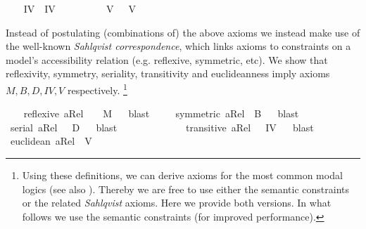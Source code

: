 \begin{isabellebody}
\ \ \isamarkupfalse%
\ IV\ \ {\isachardoublequoteopen}IV\ {\isasymequiv}\ \isactrlbold {\isasymforall}{\isasymphi}{\isachardot}\ \isactrlbold {\isasymbox}{\isasymphi}\ \isactrlbold {\isasymrightarrow}\ \ \isactrlbold {\isasymbox}\isactrlbold {\isasymbox}{\isasymphi}{\isachardoublequoteclose}\isanewline
\ \ \isamarkupfalse%
\ V\ \ \ {\isachardoublequoteopen}V\ {\isasymequiv}\ \isactrlbold {\isasymforall}{\isasymphi}{\isachardot}\ \isactrlbold {\isasymdiamond}{\isasymphi}\ \isactrlbold {\isasymrightarrow}\ \isactrlbold {\isasymbox}\isactrlbold {\isasymdiamond}{\isasymphi}{\isachardoublequoteclose}%
\begin{isamarkuptext}%
Instead of postulating (combinations of) the above  axioms we instead make use of 
  the well-known \emph{Sahlqvist correspondence}, which links axioms to constraints on a model's accessibility
  relation (e.g. reflexive, symmetric, etc). We show  that  reflexivity, symmetry, seriality, transitivity and euclideanness imply
  axioms $M, B, D, IV, V$ respectively.
  \footnote{Using these definitions, we can derive axioms for the most common modal logics (see also \cite{C47}). 
  Thereby we are free to use either the semantic constraints or the related \emph{Sahlqvist} axioms. Here we provide 
  both versions. In what follows we use the semantic constraints (for improved performance).}%
\end{isamarkuptext}\isamarkuptrue%
\ \ \isamarkupfalse%
\ {\isachardoublequoteopen}reflexive\ aRel\ \ {\isasymLongrightarrow}\ \ {\isasymlfloor}M{\isasymrfloor}{\isachardoublequoteclose}%
\ %
%
\isamarkupfalse%
\ blast\ %
%
%
%
\isanewline
\ \ \isamarkupfalse%
\ {\isachardoublequoteopen}symmetric\ aRel\ {\isasymLongrightarrow}\ {\isasymlfloor}B{\isasymrfloor}{\isachardoublequoteclose}%
\ %
%
\isamarkupfalse%
\ blast%
%
%
\isanewline
\ \ \isamarkupfalse%
\ {\isachardoublequoteopen}serial\ aRel\ \ {\isasymLongrightarrow}\ {\isasymlfloor}D{\isasymrfloor}{\isachardoublequoteclose}%
\ %
%
\isamarkupfalse%
\ blast%
%
%
\ \ \ \ \ \ \ \ \ \isanewline
\ \ \isamarkupfalse%
\ {\isachardoublequoteopen}transitive\ aRel\ \ {\isasymLongrightarrow}\ {\isasymlfloor}IV{\isasymrfloor}{\isachardoublequoteclose}%
\ %
%
\isamarkupfalse%
\ blast%
%
%
\ \ \ \isanewline
\ \ \isamarkupfalse%
\ {\isachardoublequoteopen}euclidean\ aRel\ {\isasymLongrightarrow}\ {\isasymlfloor}V{\isasymrfloor}{\isachardoublequoteclose}%

\end{isabellebody}
